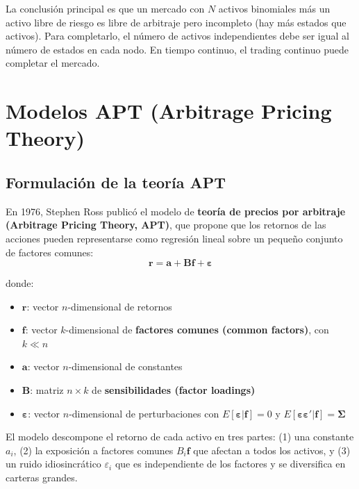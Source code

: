 \documentclass[12pt]{article}
\begin{document}
\begin{intuicion}
La conclusi\'on principal es que un mercado con $N$ activos binomiales m\'as un activo libre de riesgo es libre de arbitraje pero incompleto (hay m\'as estados que activos). Para completarlo, el n\'umero de activos independientes debe ser igual al n\'umero de estados en cada nodo. En tiempo continuo, el trading continuo puede completar el mercado.
\end{intuicion}

\section{Modelos APT (Arbitrage Pricing Theory)}

\subsection{Formulaci\'on de la teor\'ia APT}

En 1976, Stephen Ross public\'o el modelo de \textbf{teor\'ia de precios por arbitraje (Arbitrage Pricing Theory, APT)}, que propone que los retornos de las acciones pueden representarse como regresi\'on lineal sobre un peque\~no conjunto de factores comunes:
\begin{equation}
    \mathbf{r} = \mathbf{a} + \mathbf{B}\mathbf{f} + \boldsymbol{\varepsilon}
\end{equation}

donde:
\begin{itemize}
    \item $\mathbf{r}$: vector $n$-dimensional de retornos
    \item $\mathbf{f}$: vector $k$-dimensional de \textbf{factores comunes (common factors)}, con $k \ll n$
    \item $\mathbf{a}$: vector $n$-dimensional de constantes
    \item $\mathbf{B}$: matriz $n \times k$ de \textbf{sensibilidades (factor loadings)}
    \item $\boldsymbol{\varepsilon}$: vector $n$-dimensional de perturbaciones con $E[\boldsymbol{\varepsilon}|\mathbf{f}] = 0$ y $E[\boldsymbol{\varepsilon}\boldsymbol{\varepsilon}'|\mathbf{f}] = \boldsymbol{\Sigma}$
\end{itemize}

\begin{intuicionmat}
El modelo descompone el retorno de cada activo en tres partes: (1) una constante $a_i$, (2) la exposici\'on a factores comunes $B_i \mathbf{f}$ que afectan a todos los activos, y (3) un ruido idiosincrático $\varepsilon_i$ que es independiente de los factores y se diversifica en carteras grandes.
\end{intuicionmat}
\end{document}
